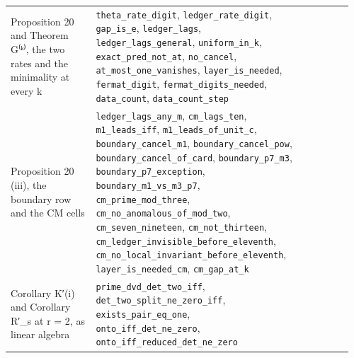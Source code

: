 \documentclass[11pt,a4paper]{article}
\theoremstyle{named}
\begin{document}
\begin{small}
\begin{longtable}{>{\raggedright\arraybackslash}p{0.242\linewidth}>{\raggedright\arraybackslash}p{0.574\linewidth}>{\raggedright\arraybackslash}p{0.143\linewidth}}
Proposition 20 and Theorem G⁽ᵏ⁾, the two rates and the minimality at every k & \texttt{theta\_\allowbreak{}rate\_\allowbreak{}digit}, \texttt{ledger\_\allowbreak{}rate\_\allowbreak{}digit}, \texttt{gap\_\allowbreak{}is\_\allowbreak{}e}, \texttt{ledger\_\allowbreak{}lags}, \texttt{ledger\_\allowbreak{}lags\_\allowbreak{}general}, \texttt{uniform\_\allowbreak{}in\_\allowbreak{}k}, \texttt{exact\_\allowbreak{}pred\_\allowbreak{}not\_\allowbreak{}at}, \texttt{no\_\allowbreak{}cancel}, \texttt{at\_\allowbreak{}most\_\allowbreak{}one\_\allowbreak{}vanishes}, \texttt{layer\_\allowbreak{}is\_\allowbreak{}needed}, \texttt{fermat\_\allowbreak{}digit}, \texttt{fermat\_\allowbreak{}digits\_\allowbreak{}needed}, \texttt{data\_\allowbreak{}count}, \texttt{data\_\allowbreak{}count\_\allowbreak{}step} & 24 \\
Proposition 20 (iii), the boundary row and the CM cells & \texttt{ledger\_\allowbreak{}lags\_\allowbreak{}any\_\allowbreak{}m}, \texttt{cm\_\allowbreak{}lags\_\allowbreak{}ten}, \texttt{m1\_\allowbreak{}leads\_\allowbreak{}iff}, \texttt{m1\_\allowbreak{}leads\_\allowbreak{}of\_\allowbreak{}unit\_\allowbreak{}c}, \texttt{boundary\_\allowbreak{}cancel\_\allowbreak{}m1}, \texttt{boundary\_\allowbreak{}cancel\_\allowbreak{}pow}, \texttt{boundary\_\allowbreak{}cancel\_\allowbreak{}of\_\allowbreak{}card}, \texttt{boundary\_\allowbreak{}p7\_\allowbreak{}m3}, \texttt{boundary\_\allowbreak{}p7\_\allowbreak{}exception}, \texttt{boundary\_\allowbreak{}m1\_\allowbreak{}vs\_\allowbreak{}m3\_\allowbreak{}p7}, \texttt{cm\_\allowbreak{}prime\_\allowbreak{}mod\_\allowbreak{}three}, \texttt{cm\_\allowbreak{}no\_\allowbreak{}anomalous\_\allowbreak{}of\_\allowbreak{}mod\_\allowbreak{}two}, \texttt{cm\_\allowbreak{}seven\_\allowbreak{}nineteen}, \texttt{cm\_\allowbreak{}not\_\allowbreak{}thirteen}, \texttt{cm\_\allowbreak{}ledger\_\allowbreak{}invisible\_\allowbreak{}before\_\allowbreak{}eleventh}, \texttt{cm\_\allowbreak{}no\_\allowbreak{}local\_\allowbreak{}invariant\_\allowbreak{}before\_\allowbreak{}eleventh}, \texttt{layer\_\allowbreak{}is\_\allowbreak{}needed\_\allowbreak{}cm}, \texttt{cm\_\allowbreak{}gap\_\allowbreak{}at\_\allowbreak{}k} & 25 \\
Corollary K′(i) and Corollary R′\_s at r = 2, as linear algebra & \texttt{prime\_\allowbreak{}dvd\_\allowbreak{}det\_\allowbreak{}two\_\allowbreak{}iff}, \texttt{det\_\allowbreak{}two\_\allowbreak{}split\_\allowbreak{}ne\_\allowbreak{}zero\_\allowbreak{}iff}, \texttt{exists\_\allowbreak{}pair\_\allowbreak{}eq\_\allowbreak{}one}, \texttt{onto\_\allowbreak{}iff\_\allowbreak{}det\_\allowbreak{}ne\_\allowbreak{}zero}, \texttt{onto\_\allowbreak{}iff\_\allowbreak{}reduced\_\allowbreak{}det\_\allowbreak{}ne\_\allowbreak{}zero} & 26 \\

\end{longtable}
\end{small}
\end{document}
